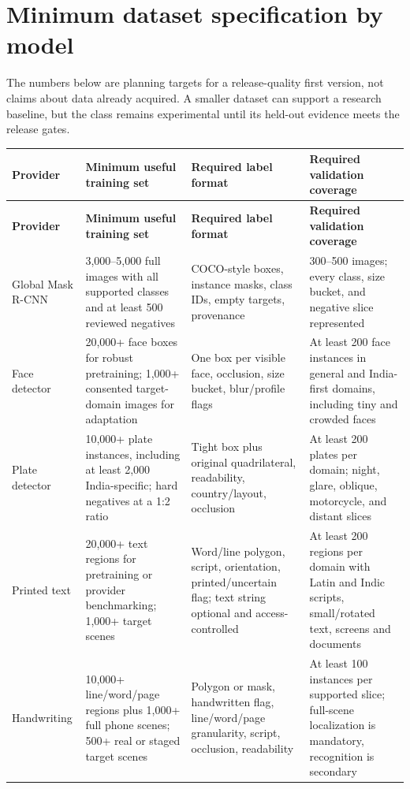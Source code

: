 \section{Minimum dataset specification by model}

The numbers below are planning targets for a release-quality first version, not claims about data already acquired. A smaller dataset can support a research baseline, but the class remains experimental until its held-out evidence meets the release gates.

\begin{longtable}{@{}L{26mm}L{31mm}L{38mm}L{42mm}@{}}
\toprule
\textbf{Provider} & \textbf{Minimum useful training set} & \textbf{Required label format} & \textbf{Required validation coverage} \\
\midrule
\endfirsthead
\toprule
\textbf{Provider} & \textbf{Minimum useful training set} & \textbf{Required label format} & \textbf{Required validation coverage} \\
\midrule
\endhead
Global Mask R-CNN & 3,000--5,000 full images with all supported classes and at least 500 reviewed negatives & COCO-style boxes, instance masks, class IDs, empty targets, provenance & 300--500 images; every class, size bucket, and negative slice represented \\
Face detector & 20,000+ face boxes for robust pretraining; 1,000+ consented target-domain images for adaptation & One box per visible face, occlusion, size bucket, blur/profile flags & At least 200 face instances in general and India-first domains, including tiny and crowded faces \\
Plate detector & 10,000+ plate instances, including at least 2,000 India-specific; hard negatives at a 1:2 ratio & Tight box plus original quadrilateral, readability, country/layout, occlusion & At least 200 plates per domain; night, glare, oblique, motorcycle, and distant slices \\
Printed text & 20,000+ text regions for pretraining or provider benchmarking; 1,000+ target scenes & Word/line polygon, script, orientation, printed/uncertain flag; text string optional and access-controlled & At least 200 regions per domain with Latin and Indic scripts, small/rotated text, screens and documents \\
Handwriting & 10,000+ line/word/page regions plus 1,000+ full phone scenes; 500+ real or staged target scenes & Polygon or mask, handwritten flag, line/word/page granularity, script, occlusion, readability & At least 100 instances per supported slice; full-scene localization is mandatory, recognition is secondary \\

\end{longtable}
